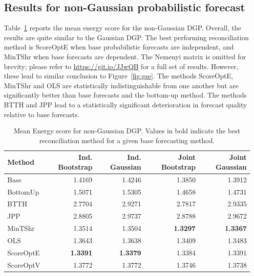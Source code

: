 \documentclass[11pt]{article}
\theoremstyle{definition}
\begin{document}
\subsection{Results for non-Gaussian probabilistic forecast} \label{sec:SimSamplingResults}

Table~\ref{tab:nse} reports the mean energy score for the non-Gaussian DGP\@. Overall, the results are quite similar to the Gaussian DGP\@. The best performing reconciliation method is ScoreOptE when base probabilistic forecasts are independent, and MinTShr when base forecasts are dependent. The Nemenyi matrix is omitted for brevity; please refer to \url{https://git.io/JJwQB} for a full set of results. However, these lead to similar conclusion to Figure~\ref{fig:gse}. The methods ScoreOptE, MinTShr and OLS are statistically indistinguishable from one another but are significantly better than base forecasts and the bottom-up method. The methods BTTH and JPP lead to a statistically significant deterioration in forecast quality relative to base forecasts.



\begin{table}[H]
	\footnotesize
	\caption{\label{tab:nse} Mean Energy score for non-Gaussian DGP\@. Values in bold indicate the best reconciliation method for a given base forecasting method.}
	\centering
	\begin{tabular}[t]{lrrrr}
		\toprule
    Method    & Ind. Bootstrap  & Ind. Gaussian   & Joint Bootstrap & Joint Gaussian\\
		\midrule
    Base      & 1.4169          & 1.4246          & 1.3850          & 1.3912\\
    BottomUp  & 1.5071          & 1.5305          & 1.4658          & 1.4731\\
    BTTH      & 2.7704          & 2.9271          & 2.7817          & 2.9335\\
    JPP       & 2.8805          & 2.9737          & 2.8788          & 2.9672\\
    MinTShr   & 1.3514          & 1.3504          & \textbf{1.3297} & \textbf{1.3367}\\
    OLS       & 1.3643          & 1.3638          & 1.3409          & 1.3483\\
    ScoreOptE & \textbf{1.3391} & \textbf{1.3379} & 1.3384          & 1.3391\\
    ScoreOptV & 1.3772          & 1.3772          & 1.3746          & 1.3738\\
		\bottomrule
	\end{tabular}
\end{table}
\end{document}
